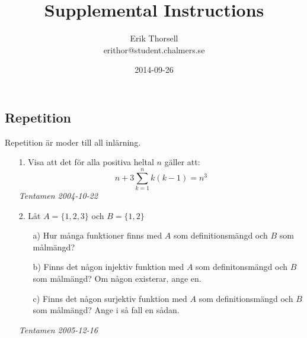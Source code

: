 \documentclass{article}
\title{Supplemental Instructions}
\author{Erik Thorsell \\ 
		\small{erithor@student.chalmers.se}
}
\date{2014-09-26}
\begin{document}
\maketitle

\subsection*{Repetition}
Repetition är moder till all inlärning.
\begin{enumerate}

\item[1.]
Visa att det för alla positiva heltal $n$ gäller att:
$$n+3\sum\limits_{k=1}^{n} k(k-1) = n^3$$
{\it Tentamen 2004-10-22}

\item[2.]
Låt $A=\{1,2,3\}$ och $B=\{1,2\}$
\begin{itemize}
\item[a)] Hur många funktioner finns med $A$ som definitionsmängd och $B$ som målmängd?
\item[b)] Finns det någon injektiv funktion med $A$ som definitonsmängd och $B$ som målmängd?
Om någon existerar, ange en.
\item[c)] Finns det någon surjektiv funktion med $A$ som definitionsmängd och $B$ som målmängd?
Ange i så fall en sådan.
\end{itemize}
{\it Tentamen 2005-12-16}
\end{enumerate}
\end{document}
